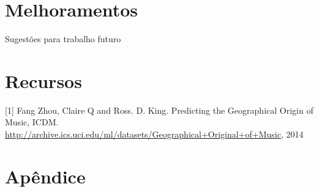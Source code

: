 \documentclass[a4paper]{article}
\begin{document}
\section{Melhoramentos}

Sugestões para trabalho futuro


\section{Recursos}

[1] Fang Zhou, Claire Q and Ross. D. King. Predicting the Geographical Origin of Music, ICDM.
\url{http://archive.ics.uci.edu/ml/datasets/Geographical+Original+of+Music}, 2014

\clearpage


\section{Apêndice}
\end{document}
